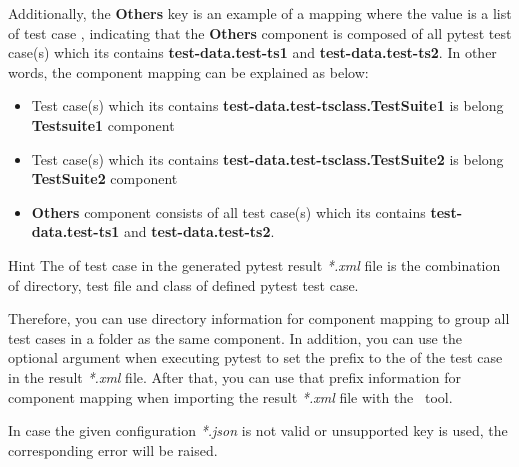\begin{itemize}
\begin{itemize}
\begin{itemize}
                Additionally, the \textbf{Others} key is an example of a mapping 
                where the value is a list of test case , 
                indicating that the \textbf{Others} component is composed of all
                pytest test case(s) which its  contains
                \textbf{test-data.test-ts1} and \textbf{test-data.test-ts2}.
                \newline
                In other words, the component mapping can be explained as below:
                \begin{itemize}
                  \item Test case(s) which its  contains
                        \textbf{test-data.test-tsclass.TestSuite1} is belong 
                        \textbf{Testsuite1} component
                  \item Test case(s) which its  contains
                        \textbf{test-data.test-tsclass.TestSuite2} is belong 
                        \textbf{TestSuite2} component
                  \item \textbf{Others} component consists of all test case(s)
                        which its  contains \textbf{test-data.test-ts1} 
                        and \textbf{test-data.test-ts2}.
                \end{itemize}

                \begin{boxhint} {Hint}
                  The  of test case in the generated pytest 
                  result \emph{*.xml} file is the combination of directory, 
                  test file and class of defined pytest test case.

                  Therefore, you can use directory information for component 
                  mapping to group all test cases in a folder as the same component.
                  \newline
                  In addition, you can use the optional argument  
                  when executing pytest to set the prefix to the  
                  of the test case in the result \emph{*.xml} file. After that, 
                  you can use that prefix information for component mapping when 
                  importing the result \emph{*.xml} file with the \pkg\ tool.
                \end{boxhint}
              \end{itemize}
          \end{itemize}

          In case the given configuration \emph{*.json} is not valid or 
          unsupported key is used, the corresponding error will be raised.
      \end{itemize}

